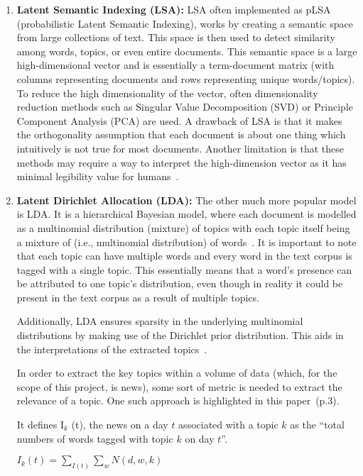 \begin{enumerate}
    \item \textbf{Latent Semantic Indexing (LSA):} LSA often implemented as pLSA (probabilistic Latent Semantic Indexing), works by creating a semantic space from large collections of text. This space is then used to detect similarity among words, topics, or even entire documents. This semantic space is a large high-dimensional vector and is essentially a term-document matrix (with columns representing documents and rows representing unique words/topics). To reduce the high dimensionality of the vector, often dimensionality reduction methods such as Singular Value Decomposition (SVD) or Principle Component Analysis (PCA) are used. A drawback of LSA is that it makes the orthogonality assumption that each document is about one thing which intuitively is not true for most documents. Another limitation is that these methods may require a way to interpret the high-dimension vector as it has minimal legibility value for humans~\cite{24_rinaldi2021semantic}.
    
    \item \textbf{Latent Dirichlet Allocation (LDA):} The other much more popular model is LDA. It is a hierarchical Bayesian model, where each document is modelled as a multinomial distribution (mixture) of topics with each topic itself being a mixture of (i.e., multinomial distribution) of words~\cite{25_lda}. It is important to note that each topic can have multiple words and every word in the text corpus is tagged with a single topic. This essentially means that a word's presence can be attributed to one topic's distribution, even though in reality it could be present in the text corpus as a result of multiple topics. 
    
    Additionally, LDA ensures sparsity in the underlying multinomial distributions by making use of the Dirichlet prior distribution. This aids in the interpretations of the extracted topics~\cite{23_topic_extraction}.

    In order to extract the key topics within a volume of data (which, for the scope of this project, is news), some sort of metric is needed to extract the relevance of a topic.   
One such approach is highlighted in this paper~\cite{23_topic_extraction}(p.3).

It defines I$_{k}$ (t), the news on a day $t$ associated with a topic $k$ as the  ``total numbers of words tagged with topic $k$ on day $t$''. 

\begin{center}
    $ I_{k} (t) = \sum_{I(t)} \sum_{w} N (d, w, k) $
\end{center}


\end{enumerate}
